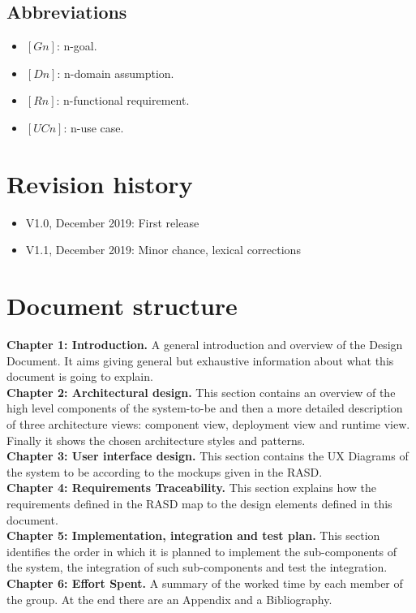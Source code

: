 \documentclass[../RASD.tex]{subfiles}
\begin{document}
    \subsection{Abbreviations}\label{subsec:abbreviations}
    \begin{itemize}
        \item $[Gn]$: n-goal.
        \item $[Dn]$: n-domain assumption.
        \item $[Rn]$: n-functional requirement.
        \item $[UCn]$: n-use case.
    \end{itemize}
    \newpage
    \section{Revision history}\label{sec:revision-history}
    \begin{itemize}
        \item V1.0, December  2019: First release
        \item V1.1, December  2019: Minor chance, lexical corrections
    \end{itemize}
    \section{Document structure}\label{sec:document-structure}
    \textbf{Chapter 1: Introduction.}
    A general introduction and overview of the Design Document.
    It aims giving general but exhaustive information about what this document is going to explain.
    \\
    \textbf{Chapter 2: Architectural design.}
    This section contains an overview of the high level components of the system-to-be and then a more detailed description of three architecture views:
    component view, deployment view and runtime view.
    Finally it shows the chosen architecture styles and patterns.
    \\
    \textbf{Chapter 3: User interface design.}
    This section contains the UX Diagrams of the system to be according to the mockups given in the RASD.
    \\
    \textbf{Chapter 4: Requirements Traceability.}
    This section explains how the requirements defined in the RASD map to the design elements defined in this document.
    \\
    \textbf{Chapter 5: Implementation, integration and test plan.}
    This section identifies the order in which it is planned to implement the sub-components of the system,
    the integration of such sub-components and test the integration.
    \\
    \textbf{Chapter 6: Effort Spent.} A summary of the worked time by each member of the group.
    At the end there are an Appendix and a Bibliography.
\end{document}

